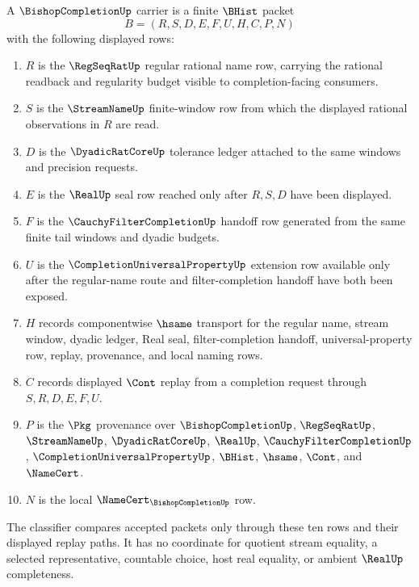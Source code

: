 \begin{definition}
\label{def:bishopcompletion-carrier}
A $\BishopCompletionUp$ carrier is a finite $\BHist$ packet
$$
B=(R,S,D,E,F,U,H,C,P,N)
$$
with the following displayed rows:
\begin{enumerate}
\item $R$ is the $\RegSeqRatUp$ regular rational name row, carrying the rational readback and regularity budget visible to completion-facing consumers.
\item $S$ is the $\StreamNameUp$ finite-window row from which the displayed rational observations in $R$ are read.
\item $D$ is the $\DyadicRatCoreUp$ tolerance ledger attached to the same windows and precision requests.
\item $E$ is the $\RealUp$ seal row reached only after $R,S,D$ have been displayed.
\item $F$ is the $\CauchyFilterCompletionUp$ handoff row generated from the same finite tail windows and dyadic budgets.
\item $U$ is the $\CompletionUniversalPropertyUp$ extension row available only after the regular-name route and filter-completion handoff have both been exposed.
\item $H$ records componentwise $\hsame$ transport for the regular name, stream window, dyadic ledger, Real seal, filter-completion handoff, universal-property row, replay, provenance, and local naming rows.
\item $C$ records displayed $\Cont$ replay from a completion request through $S,R,D,E,F,U$.
\item $P$ is the $\Pkg$ provenance over $\BishopCompletionUp$, $\RegSeqRatUp$, $\StreamNameUp$, $\DyadicRatCoreUp$, $\RealUp$, $\CauchyFilterCompletionUp$, $\CompletionUniversalPropertyUp$, $\BHist$, $\hsame$, $\Cont$, and $\NameCert$.
\item $N$ is the local $\NameCert_{\BishopCompletionUp}$ row.
\end{enumerate}
The classifier compares accepted packets only through these ten rows and their displayed replay paths. It has no coordinate for quotient stream equality, a selected representative, countable choice, host real equality, or ambient $\RealUp$ completeness.
\end{definition}

